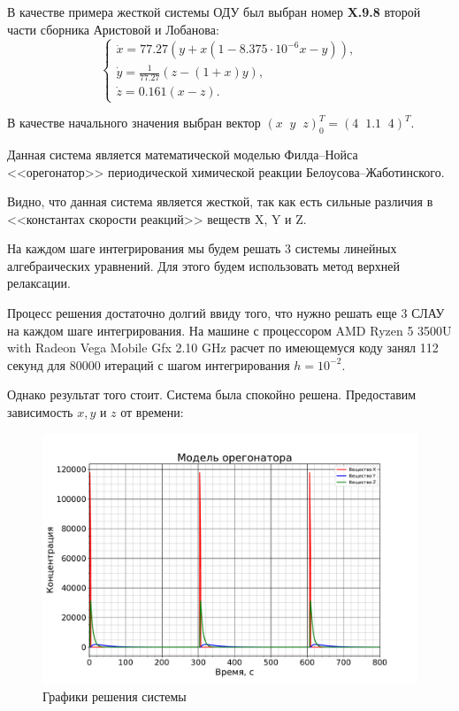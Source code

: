		В качестве примера жесткой системы ОДУ был выбран номер \textbf{X.9.8} второй части сборника Аристовой и Лобанова:
		\begin{equation*}
			\begin{cases*}
				\dot{x} = 77.27(y + x (1 - 8.375 \cdot 10^{-6} x - y)), \\
				\dot{y} = \frac{1}{77.27}(z - (1 + x)y), \\
				\dot{z} = 0.161(x - z).
			\end{cases*}
		\end{equation*}
	
		В качестве начального значения выбран вектор $(x \;\; y \;\; z)^T_0 = (4 \;\; 1.1 \;\; 4)^T$.
		
		Данная система является математической моделью Филда–Нойса <<орегонатор>> периодической химической реакции Белоусова–Жаботинского.
		
		Видно, что данная система является жесткой, так как есть сильные различия в <<константах скорости реакций>> веществ X, Y и Z.
		
		На каждом шаге интегрирования мы будем решать 3 системы линейных алгебраических уравнений. Для этого будем использовать метод верхней релаксации.
		
		Процесс решения достаточно долгий ввиду того, что нужно решать еще 3 СЛАУ на каждом шаге интегрирования. На машине с процессором AMD Ryzen 5 3500U with Radeon Vega Mobile Gfx 2.10 GHz расчет по имеющемуся коду занял 112 секунд для 80000 итераций с шагом интегрирования $h = 10^{-2}$.
		
		Однако результат того стоит. Система была спокойно решена. Предоставим зависимость $x, y$ и $z$ от времени:
		\begin{figure}[h!]
			\centering
			\includegraphics[width=1.1\linewidth]{Pictures/Full.pdf}
			\caption{Графики решения системы}
		\end{figure}
	

